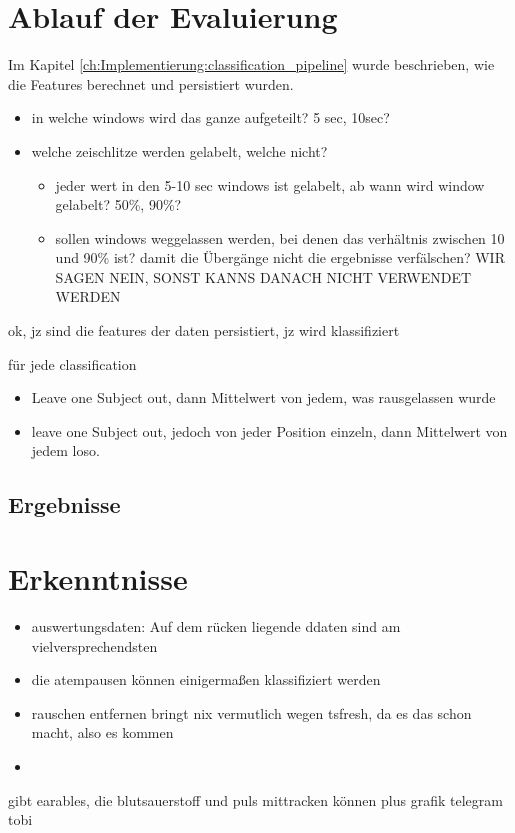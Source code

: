 \section{Ablauf der Evaluierung}
Im Kapitel \ref{ch:Implementierung:classification_pipeline} wurde beschrieben, wie die Features berechnet und persistiert wurden. 

\begin{itemize}
    \item in welche windows wird das ganze aufgeteilt? 5 sec, 10sec?
    \item welche zeischlitze werden gelabelt, welche nicht?
    \begin{itemize}
        \item jeder wert in den 5-10 sec windows ist gelabelt, ab wann wird window gelabelt? 50\%, 90\%?
        \item sollen windows weggelassen werden, bei denen das verhältnis zwischen 10 und 90\% ist? damit die Übergänge nicht die ergebnisse verfälschen? WIR SAGEN NEIN, SONST KANNS DANACH NICHT VERWENDET WERDEN
    \end{itemize}
\end{itemize}
ok, jz sind die features der daten persistiert, jz wird klassifiziert

für jede classification
\begin{itemize}
    \item Leave one Subject out, dann Mittelwert von jedem, was rausgelassen wurde
    \item leave one Subject out, jedoch von jeder Position einzeln, dann Mittelwert von jedem loso.
\end{itemize}

\subsection{Ergebnisse}

\section{Erkenntnisse}
\begin{itemize}
    \item auswertungsdaten: Auf dem rücken liegende ddaten sind am vielversprechendsten
    \item die atempausen können einigermaßen klassifiziert werden
    \item rauschen entfernen bringt nix vermutlich wegen tsfresh, da es das schon macht, also es kommen
    \item 
\end{itemize}


gibt earables, die blutsauerstoff und puls mittracken können
plus grafik telegram tobi